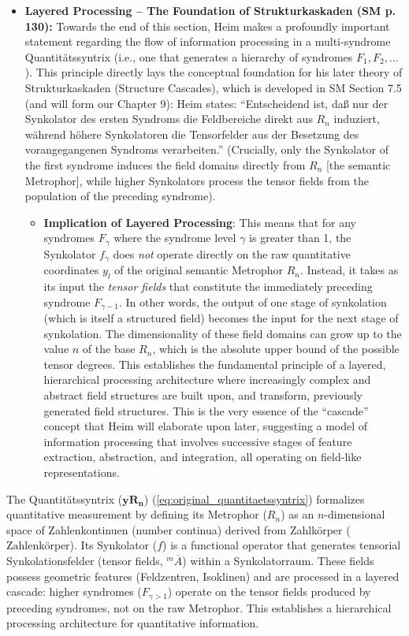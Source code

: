 \documentclass[12pt]{article}
\newcommand{\q}[1]{\enquote{#1}}
\newcommand{\syndrom}{F} %
\newcommand{\quantitaetssyntrix}{\bm{yR_n}}
\newcommand{\zahlenkoerper}{\text{Zahlenkörper}}
\begin{document}
\begin{itemize}
    \item \textbf{Layered Processing – The Foundation of Strukturkaskaden (SM p. 130):}
    Towards the end of this section, Heim makes a profoundly important statement regarding the flow of information processing in a multi-syndrome Quantitätssyntrix (i.e., one that generates a hierarchy of syndromes \( \syndrom_1, \syndrom_2, \dots \)). This principle directly lays the conceptual foundation for his later theory of Strukturkaskaden (Structure Cascades), which is developed in SM Section 7.5 (and will form our Chapter 9):
    Heim states: \q{Entscheidend ist, daß nur der Synkolator des ersten Syndroms die Feldbereiche direkt aus \( R_n \) induziert, während höhere Synkolatoren die Tensorfelder aus der Besetzung des vorangegangenen Syndroms verarbeiten.} (Crucially, only the Synkolator of the first syndrome induces the field domains directly from \( R_n \) [the semantic Metrophor], while higher Synkolators process the tensor fields from the population of the preceding syndrome).
    \begin{itemize}
        \item \textbf{Implication of Layered Processing}: This means that for any syndromes \( \syndrom_\gamma \) where the syndrome level \( \gamma \) is greater than 1, the Synkolator \( f_\gamma \) does \textit{not} operate directly on the raw quantitative coordinates \( y_l \) of the original semantic Metrophor \( R_n \). Instead, it takes as its input the \textit{tensor fields} that constitute the immediately preceding syndrome \( \syndrom_{\gamma-1} \). In other words, the output of one stage of synkolation (which is itself a structured field) becomes the input for the next stage of synkolation. The dimensionality of these field domains can grow up to the value $n$ of the base $R_n$, which is the absolute upper bound of the possible tensor degrees. This establishes the fundamental principle of a layered, hierarchical processing architecture where increasingly complex and abstract field structures are built upon, and transform, previously generated field structures. This is the very essence of the \q{cascade} concept that Heim will elaborate upon later, suggesting a model of information processing that involves successive stages of feature extraction, abstraction, and integration, all operating on field-like representations.
    \end{itemize}
\end{itemize}

The Quantitätssyntrix (\(\quantitaetssyntrix\)) (\eqref{eq:original_quantitaetssyntrix}) formalizes quantitative measurement by defining its Metrophor (\(R_n\)) as an \(n\)-dimensional space of Zahlenkontinuen (number continua) derived from Zahlkörper (\(\zahlenkoerper\)). Its Synkolator (\(f\)) is a functional operator that generates tensorial Synkolationsfelder (tensor fields, \(^m\overline{A}\)) within a Synkolatorraum. These fields possess geometric features (Feldzentren, Isoklinen) and are processed in a layered cascade: higher syndromes (\(\syndrom_{\gamma > 1}\)) operate on the tensor fields produced by preceding syndromes, not on the raw Metrophor. This establishes a hierarchical processing architecture for quantitative information.
\end{document}
